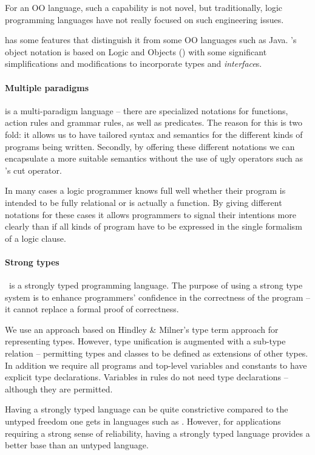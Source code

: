 For an OO language, such a capability is not novel, but traditionally, logic programming languages have not really focused on such engineering issues.

\go has some features that distinguish it from some OO languages such as Java\tm. \go's object notation is based on Logic and Objects (\cite{fgm:92}) with some significant simplifications and modifications to incorporate types and  \emph{interface}s.

\paragraph{Multiple paradigms}
\go is a multi-paradigm language -- there are specialized notations for  functions, action rules and grammar rules, as well as predicates. The reason for this is two fold: it allows us to have tailored syntax and semantics for the different kinds of programs being written. Secondly, by offering these different notations we can encapsulate a more suitable semantics without the use of ugly operators such as \prolog's cut operator.

In many cases a logic programmer knows full well whether their program is intended to be fully relational or is actually a function. By giving different notations for these cases it allows programmers to signal their intentions more clearly than if all kinds of program have to be expressed in the single formalism of a logic clause.

\paragraph{Strong types}
\go\ is a strongly typed programming language. The purpose of using a strong type system is to enhance programmers' confidence in the correctness of the program -- it cannot replace a formal proof of correctness.

We use an approach based on Hindley \& Milner's \cite{hindley:69} type term approach for representing types. However, type unification is augmented with a sub-type relation -- permitting types and classes to be defined as extensions of other types. In addition we require all programs and top-level variables and constants to have explicit type declarations. Variables in rules do not need type declarations -- although they are permitted.

Having a strongly typed language can be quite constrictive compared to the untyped freedom one gets in languages such as \prolog.  However, for applications requiring a strong sense of reliability, having a strongly typed language provides a better base than an untyped language.

